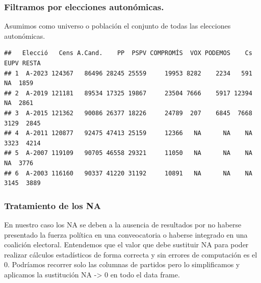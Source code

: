 \documentclass[
]{article}
\newenvironment{Shaded}{\begin{snugshade}}{\end{snugshade}}
\newcommand{\CommentTok}[1]{\textcolor[rgb]{0.56,0.35,0.01}{\textit{#1}}}
\newcommand{\FunctionTok}[1]{\textcolor[rgb]{0.13,0.29,0.53}{\textbf{#1}}}
\newcommand{\NormalTok}[1]{#1}
\newcommand{\OtherTok}[1]{\textcolor[rgb]{0.56,0.35,0.01}{#1}}
\newcommand{\SpecialCharTok}[1]{\textcolor[rgb]{0.81,0.36,0.00}{\textbf{#1}}}
\newcommand{\StringTok}[1]{\textcolor[rgb]{0.31,0.60,0.02}{#1}}
\begin{document}
\hypertarget{filtramos-por-elecciones-autonuxf3micas.}{%
\subsubsection{Filtramos por elecciones
autonómicas.}\label{filtramos-por-elecciones-autonuxf3micas.}}

Asumimos como universo o población el conjunto de todas las elecciones
autonómicas.

\begin{Shaded}
\end{Shaded}

\begin{verbatim}
##   Elecció   Cens A.Cand.    PP  PSPV COMPROMÍS  VOX PODEMOS    Cs EUPV RESTA
## 1  A-2023 124367   86496 28245 25559     19953 8282    2234   591   NA  1859
## 2  A-2019 121181   89534 17325 19867     23504 7666    5917 12394   NA  2861
## 3  A-2015 121362   90086 26377 18226     24789  207    6845  7668 3129  2845
## 4  A-2011 120877   92475 47413 25159     12366   NA      NA    NA 3323  4214
## 5  A-2007 119109   90705 46558 29321     11050   NA      NA    NA   NA  3776
## 6  A-2003 116160   90337 41220 31192     10891   NA      NA    NA 3145  3889
\end{verbatim}

\hypertarget{tratamiento-de-los-na}{%
\subsubsection{Tratamiento de los NA}\label{tratamiento-de-los-na}}

En nuestro caso los NA se deben a la ausencia de resultados por no
haberse presentado la fuerza política en una conveocatoria o haberse
integrado en una coalición electoral. Entendemos que el valor que debe
sustituir NA para poder realizar cálculos estadísticos de forma correcta
y sin errores de computación es el 0. Podríamos recorrer solo las
columnas de partidos pero lo simplificamos y aplicamos la sustitución NA
-\textgreater{} 0 en todo el data frame.
\end{document}
